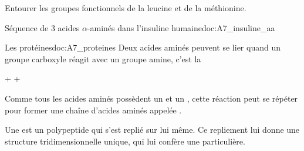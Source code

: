 
\numeroQuestion Entourer les groupes fonctionnels de la leucine et de la méthionine.


\begin{doc}{Séquence de 3 acides $\alpha$-aminés dans l'insuline humaine}{doc:A7_insuline_aa}
  \begin{center}
  \end{center}
\end{doc}

\begin{doc}{Les protéines}{doc:A7_proteines}
  Deux acides aminés peuvent se lier quand un groupe carboxyle réagit avec un groupe amine, c'est la 
  
  \begin{center}
     +   
    \reaction
     +
  \end{center}
  \vspace*{-4pt}

  Comme tous les acides aminés possèdent un  et un , cette réaction peut se répéter pour former une chaîne d'acides aminés appelée .

  \begin{encart}
    Une  est un polypeptide qui s'est replié sur lui même.
    Ce repliement lui donne une structure tridimensionnelle unique, qui lui confère une  particulière.
  \end{encart}
  \begin{center}
  \end{center}
\end{doc}


